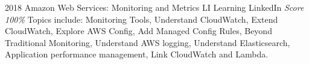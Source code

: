 \documentclass[11pt,a4paper]{moderncv}
\begin{document}
\cventry
    {2018}
    {Amazon Web Services: Monitoring and Metrics}
    {LI Learning}
    {LinkedIn}
    {\textit{Score 100\%}}
    {
        Topics include:                                                          %
            Monitoring Tools,                                                          %
            Understand CloudWatch,                                                          %
            Extend CloudWatch,                                                          %
            Explore AWS Config,                                                          %
            Add Managed Config Rules,                                                          %
            Beyond Traditional Monitoring,                                                          %
            Understand AWS logging,                                                          %
            Understand Elasticsearch,                                                          %
            Application performance management,                                                          %
            Link CloudWatch and Lambda.                                                          %
    }
\end{document}
